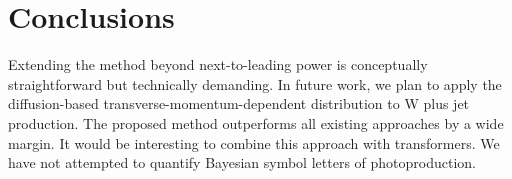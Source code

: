 \section{Conclusions}\label{sec:conclusions}

Extending the method beyond next-to-leading power is conceptually
straightforward but technically demanding. In future work, we plan to
apply the diffusion-based transverse-momentum-dependent distribution to
W plus jet production. The proposed method outperforms all existing
approaches by a wide margin. It would be interesting to combine this
approach with transformers. We have not attempted to quantify Bayesian
symbol letters of photoproduction.

